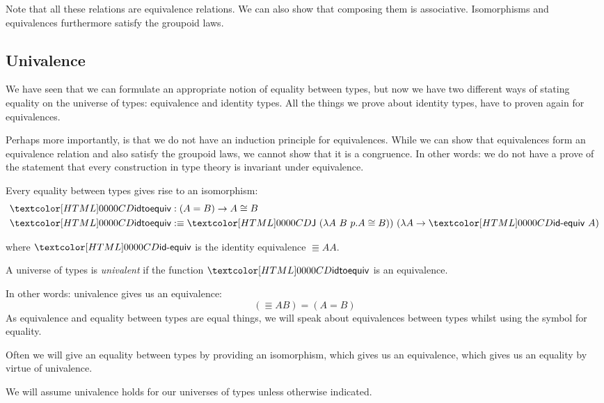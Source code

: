 Note that all these relations are equivalence relations. We can also
show that composing them is associative. Isomorphisms and
equivalences furthermore satisfy the groupoid laws.

\subsection{Univalence}

We have seen that we can formulate an appropriate notion of equality
between types, but now we have two different ways of stating equality
on the universe of types: equivalence and identity types. All the
things we prove about identity types, have to proven again for
equivalences. 

Perhaps more importantly, is that we do not have an induction
principle for equivalences. While we can show that equivalences form
an equivalence relation and also satisfy the groupoid laws, we cannot
show that it is a congruence. In other words: we do not have a prove
of the statement that every construction in type theory is invariant
under equivalence.

\begin{definition}
  Every equality between types gives rise to an isomorphism:
  \begin{align*}
    &\idtoequiv : (A = B) \to \Equiv{A}{B} \\
    &\idtoequiv \ddefeq \J\ (\lambda A\ B\ p . \Equiv{A}{B}))\ (\lambda A \to \idequiv\ A)
  \end{align*}

  where $\idequiv$ is the identity equivalence $\Equiv{A}{A}$.
\end{definition}

\begin{definition}[Univalence]
  A universe of types is \emph{univalent} if the function $\idtoequiv$
  is an equivalence.
\end{definition}

In other words: univalence gives us an equivalence:
$$
(\Equiv{A}{B}) = (A = B)
$$
As equivalence and equality between types are equal things, we will
speak about equivalences between types whilst using the symbol for
equality.

Often we will give an equality between types by providing an
isomorphism, which gives us an equivalence, which gives us an equality
by virtue of univalence.

We will assume univalence holds for our universes of types unless
otherwise indicated.

